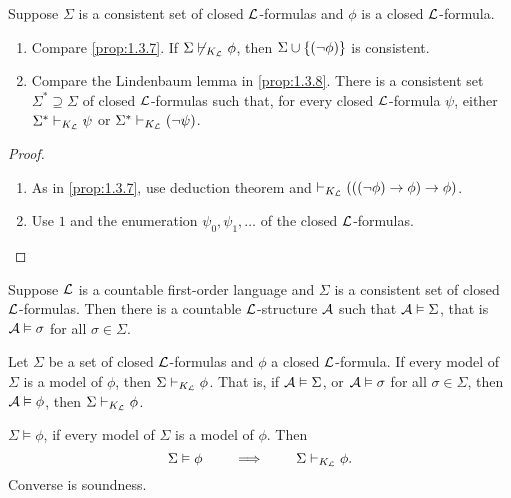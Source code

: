 \begin{proposition}
\label{prop:2.5.2}
Suppose $ \Sigma $ is a consistent set of closed $ \LL $-formulas and $ \phi $ is a closed $ \LL $-formula.
\begin{enumerate}
\item Compare \ref{prop:1.3.7}. If $ \Sigma \not\vdash_{K_{\LL}} \phi $, then $ \Sigma \cup \cb{\notb{\phi}} $ is consistent.
\item Compare the Lindenbaum lemma in \ref{prop:1.3.8}. There is a consistent set $ \Sigma^* \supseteq \Sigma $ of closed $ \LL $-formulas such that, for every closed $ \LL $-formula $ \psi $, either $ \Sigma^* \vdash_{K_{\LL}} \psi $ or $ \Sigma^* \vdash_{K_{\LL}} \notb{\psi} $.
\end{enumerate}
\end{proposition}

\begin{proof}
\hfill
\begin{enumerate}
\item As in \ref{prop:1.3.7}, use deduction theorem and $ \vdash_{K_{\LL}} \impb{\impb{\notb{\phi}}{\phi}}{\phi} $.
\item Use $ 1 $ and the enumeration $ \psi_0, \psi_1, \dots $ of the closed $ \LL $-formulas.
\end{enumerate}
\end{proof}

\pagebreak

\begin{theorem}
\label{thm:2.5.3}
Suppose $ \LL $ is a countable first-order language and $ \Sigma $ is a consistent set of closed $ \LL $-formulas. Then there is a countable $ \LL $-structure $ \AA $ such that $ \AA \vDash \Sigma $, that is $ \AA \vDash \sigma $ for all $ \sigma \in \Sigma $.
\end{theorem}

\begin{theorem}
\label{thm:2.5.4}
Let $ \Sigma $ be a set of closed $ \LL $-formulas and $ \phi $ a closed $ \LL $-formula. If every model of $ \Sigma $ is a model of $ \phi $, then $ \Sigma \vdash_{K_{\LL}} \phi $. That is, if $ \AA \vDash \Sigma $, or $ \AA \vDash \sigma $ for all $ \sigma \in \Sigma $, then $ \AA \vDash \phi $, then $ \Sigma \vdash_{K_{\LL}} \phi $.
\end{theorem}

\begin{notation*}
$ \Sigma \vDash \phi $, if every model of $ \Sigma $ is a model of $ \phi $. Then
$$ \Sigma \vDash \phi \qquad \implies \qquad \Sigma \vdash_{K_{\LL}} \phi. $$ Converse is soundness.
\end{notation*}

